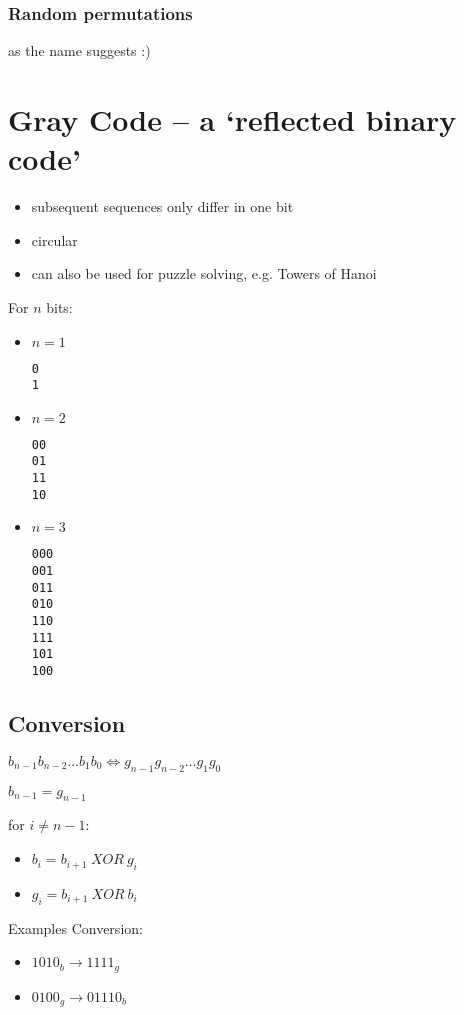 \documentclass[11pt]{article}
\begin{document}
\subsubsection{Random permutations}

as the name suggests :)

\section{Gray Code – a `reflected binary code'}

\begin{itemize}
\item subsequent sequences only differ in one bit
\item circular
\item can also be used for puzzle solving, e.g. Towers of Hanoi
\end{itemize}

For $ n $ bits:
\begin{itemize}

\item $ n = 1 $
	\begin{lstlisting}
0
1
	\end{lstlisting}

\item $ n = 2 $
	\begin{lstlisting}
00
01
11
10
	\end{lstlisting}

\item $ n = 3 $
	\begin{lstlisting}
000
001
011
010
110
111
101
100
	\end{lstlisting}

\end{itemize}

\subsection{Conversion}

$ b_{n - 1} b_{n - 2} \dots b_{1} b_0 \Longleftrightarrow g_{n - 1} g_{n - 2} \dots g_{1} g_0 $

$ b_{n - 1} = g_{n - 1} $ \newline

for $ i \neq n - 1 $:
\begin{itemize}
\item $ b_i = b_{i + 1} ~ XOR ~g_{i} $
\item $ g_i = b_{i + 1} ~ XOR ~ b_{i} $
\end{itemize}

Examples Conversion:
\begin{itemize}
\item $ 1010_b \rightarrow 1111_g $
\item $ 0100_g \rightarrow 01110_b $
\end{itemize}
\end{document}
